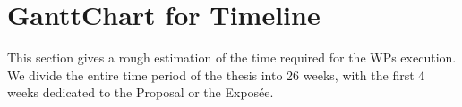 \section{GanttChart for Timeline}
	


This section gives a rough estimation of the time required for the WPs execution.
We divide the entire time period of the thesis into 26 weeks, with the first 4 weeks dedicated to the Proposal or the Exposée.

